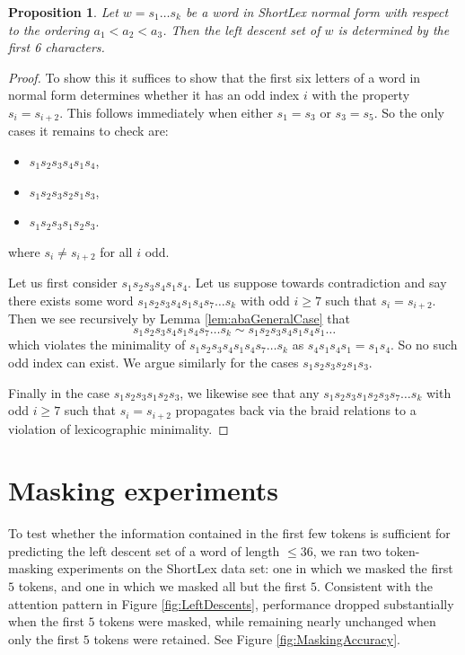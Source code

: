 \documentclass{article}
\newtheorem{proposition}{Proposition}
\begin{document}
\begin{proposition}\label{prop:6LetterEnoughPrecise}
    Let $w=s_1\ldots s_k$ be a word in ShortLex normal form with respect to the ordering $a_1<a_2<a_3$. Then the left descent set of $w$ is determined by the first 6 characters.
\end{proposition}
\begin{proof}
    To show this it suffices to show that the first six letters of a word in normal form determines whether it has an odd index $i$ with the property $s_i=s_{i+2}$. This follows immediately when either $s_1=s_3$ or $s_3=s_5$. So the only cases it remains to check are:
    \begin{itemize}
        \item $s_1s_2s_3s_4s_1s_4$,
        \item $s_1s_2s_3s_2s_1s_3$,
        \item $s_1s_2s_3s_1s_2s_3$.
    \end{itemize}
    where $s_i\neq s_{i+2}$ for all $i$ odd.
    \par Let us first consider $s_1s_2s_3s_4s_1s_4$. Let us suppose towards contradiction and say there exists some word $s_1s_2s_3s_4s_1s_4s_7\ldots s_k$ with odd $i\geq 7$ such that $s_{i}=s_{i+2}$. Then we see recursively by Lemma \ref{lem:abaGeneralCase} that
    $$
    s_1s_2s_3s_4s_1s_4s_7\ldots s_k \sim s_1s_2s_3s_4s_1s_4s_1\ldots
    $$
    which violates the minimality of $s_1s_2s_3s_4s_1s_4s_7\ldots s_k$ as $s_4s_1s_4s_1=s_1s_4$. So no such odd index can exist. We argue similarly for the cases $s_1s_2s_3s_2s_1s_3$. 
    \par Finally in the case $s_1s_2s_3s_1s_2s_3$, we likewise see that any $s_1s_2s_3s_1s_2s_3s_7\ldots s_k$ with odd $i\geq 7$ such that $s_{i}=s_{i+2}$ propagates back via the braid relations to a violation of lexicographic minimality.
\end{proof}

\section{Masking experiments}
To test whether the information contained in the first few tokens is sufficient for predicting the left descent set of a word of length \(\leq 36\), we ran two token-masking experiments on the ShortLex data set: one in which we masked the first \(5\) tokens, and one in which we masked all but the first \(5\). Consistent with the attention pattern in Figure \ref{fig:LeftDescents}, performance dropped substantially when the first \(5\) tokens were masked, while remaining nearly unchanged when only the first \(5\) tokens were retained. See Figure \ref{fig:MaskingAccuracy}.
\end{document}
